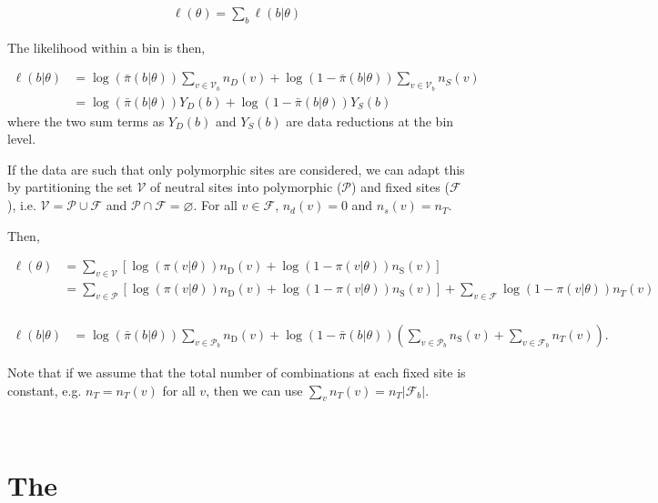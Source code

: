 \documentclass[11pt]{article}
\begin{document}
\begin{align}
   \ell(\theta) =  \sum_b \ell(b | \theta)
\end{align}

The likelihood within a bin is then,

\begin{align}
  \ell(b | \theta)  &= \log(\bar{\pi}(b | \theta)) \sum_{v \in \mathcal{V}_b} n_D(v) + \log(1-\bar{\pi}(b | \theta)) \sum_{v \in \mathcal{V}_b} n_S(v)  \\
                               &= \log(\bar{\pi}(b | \theta)) Y_D(b) + \log(1-\bar{\pi}(b | \theta)) Y_S(b)
\end{align}
%
where the two sum terms as $Y_D(b)$ and $Y_S(b)$ are data reductions at the bin
level.

If the data are such that only polymorphic sites are considered, we can adapt
this by partitioning the set $\mathcal{V}$ of neutral sites into polymorphic
($\mathcal{P}$) and fixed sites ($\mathcal{F}$), i.e. $\mathcal{V} =
\mathcal{P} \cup \mathcal{F}$ and $\mathcal{P} \cap \mathcal{F} = \varnothing$.
For all $v \in \mathcal{F}$, $n_d(v) = 0$ and $n_s(v) = n_T$.

Then, 

\begin{align}
  \ell(\theta) &= \sum_{v \in \mathcal{V}} \left[\log(\pi(v | \theta)) n_\text{D}(v) + \log(1-\pi(v | \theta)) n_\text{S}(v)\right] \\
                  &= \sum_{v \in \mathcal{P}} \left[\log(\pi(v | \theta)) n_\text{D}(v) + \log(1-\pi(v | \theta)) n_\text{S}(v)\right] + \sum_{v \in \mathcal{F}} \log(1-\pi(v | \theta)) n_T(v)  \\
\end{align}

\begin{align}
  \ell(b | \theta)  &= \log(\bar{\pi}(b | \theta)) \sum_{v \in \mathcal{P}_b} n_\text{D}(v) + \log(1-\bar{\pi}(b | \theta)) \left(\sum_{v \in \mathcal{P}_b} n_\text{S}(v) +  \sum_{v \in \mathcal{F}_b} n_T(v)  \right).
\end{align}

Note that if we assume that the total number of combinations at each fixed site
is constant, e.g. $n_T = n_T(v)$ for all $v$, then we can use $\sum_v n_T(v) =
n_T |\mathcal{F}_b|$.

\
\section*{The }
\end{document}
